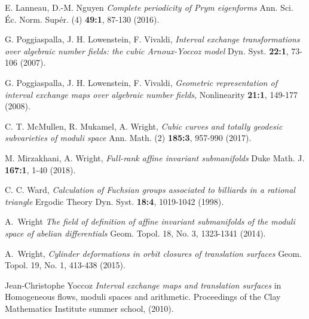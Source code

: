 \documentclass[a4paper,12pt]{article}
\begin{document}
\begin{thebibliography}{sage-flatsurf}
E. Lanneau, D.-M. Nguyen
\textit{Complete periodicity of Prym eigenforms}
Ann. Sci. Éc. Norm. Supér. (4) \textbf{49:1}, 87-130 (2016).

G. Poggiaspalla, J. H. Lowenstein, F. Vivaldi,
\textit{Interval exchange transformations over algebraic number fields: the cubic Arnoux-Yoccoz model}
Dyn. Syst. \textbf{22:1}, 73-106 (2007).

G. Poggiaspalla, J. H. Lowenstein, F. Vivaldi,
\textit{Geometric representation of interval exchange maps over algebraic number fields},
Nonlinearity \textbf{21:1}, 149-177 (2008).

C. T. McMullen, R. Mukamel, A. Wright,
\textit{Cubic curves and totally geodesic subvarieties of moduli space}
Ann. Math. (2) \textbf{185:3}, 957-990 (2017).

M. Mirzakhani, A. Wright,
\textit{Full-rank affine invariant submanifolds}
Duke Math. J. \textbf{167:1}, 1-40 (2018).

C. C. Ward,
\textit{Calculation of Fuchsian groups associated to billiards in a rational triangle}
Ergodic Theory Dyn. Syst. \textbf{18:4}, 1019-1042 (1998).

A.~Wright
\textit{The field of definition of affine invariant submanifolds of the moduli space of abelian differentials}
Geom. Topol. 18, No. 3, 1323-1341 (2014).

A.~Wright,
\textit{Cylinder deformations in orbit closures of translation surfaces}
Geom. Topol. 19, No. 1, 413-438 (2015).

Jean-Christophe Yoccoz
\textit{Interval exchange maps and translation surfaces}
in Homogeneous flows, moduli spaces and arithmetic.
Proceedings of the Clay Mathematics Institute summer school,
(2010).
\end{thebibliography}
\end{document}
